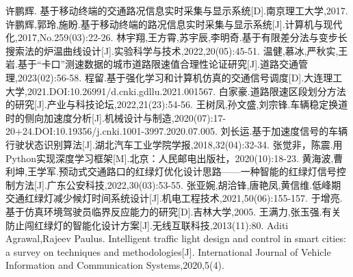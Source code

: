 \documentclass[a4paper,12pt]{article}
\numberwithin{equation}{section}
\begin{document}
\fontsize{10.5pt}{16}\selectfont
	
%	
	 \begin{thebibliography}{99} 

	 	许鹏辉. 基于移动终端的交通路况信息实时采集与显示系统[D].南京理工大学,2017.
	 	许鹏辉,郭玲,施盼.基于移动终端的路况信息实时采集与显示系统[J].计算机与现代化,2017,No.259(03):22-26.
	 	林宇翔,王方霄,苏宇辰,李明奇.基于有限差分法与变步长搜索法的炉温曲线设计[J].实验科学与技术,2022,20(05):45-51.
	 	温健,慕冰,严秋实,王岩.基于“卡口”测速数据的城市道路限速值合理性论证研究[J].道路交通管理,2023(02):56-58.
	 	程留.基于强化学习和计算机仿真的交通信号调度[D].大连理工大学,2021.DOI:10.26991/d.cnki.gdllu.2021.001567.
	 	白家豪.道路限速区段划分方法的研究[J].产业与科技论坛,2022,21(23):54-56.
	 	王树凤,孙文盛,刘宗锋.车辆稳定换道时的侧向加速度分析[J].机械设计与制造,2020(07):17-20+24.DOI:10.19356/j.cnki.1001-3997.2020.07.005.
	 	刘长运.基于加速度信号的车辆行驶状态识别算法[J].湖北汽车工业学院学报,2018,32(04):32-34.
	 	张觉非，陈震.用Python实现深度学习框架[M].北京：人民邮电出版社，2020(10):18-23.
	 	黄海波,曹利坤,王学军.预动式交通路口的红绿灯优化设计思路——一种智能的红绿灯信号控制方法[J].广东公安科技,2022,30(03):53-55.
	 	张亚婉,胡洽锋,唐艳凤,黄信维.低峰期交通红绿灯减少候灯时间系统设计[J].机电工程技术,2021,50(06):155-157.
		于增亮. 基于仿真环境驾驶员临界反应能力的研究[D].吉林大学,2005.
	 	王满力,张玉强.有关防止闯红绿灯的智能化设计方案[J].无线互联科技,2013(11):80.
	 	Aditi Agrawal,Rajeev Paulus. Intelligent traffic light design and control in smart cities: a survey on techniques and methodologies[J]. International Journal of Vehicle Information and Communication Systems,2020,5(4).
	 	
	\end{thebibliography}
\end{document}
